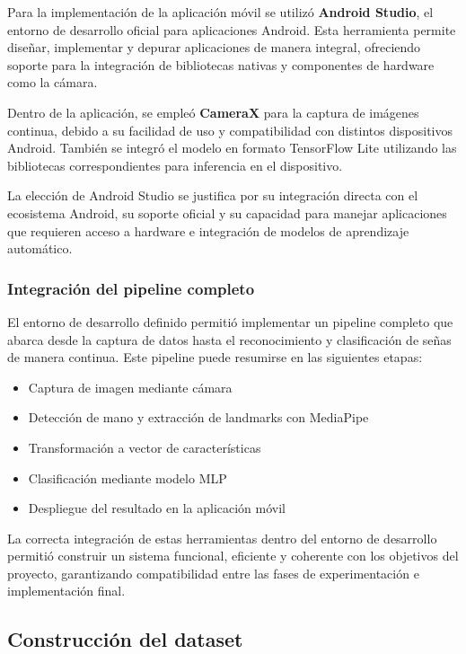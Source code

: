 	Para la implementación de la aplicación móvil se utilizó \textbf{Android Studio}, el entorno de desarrollo oficial para aplicaciones Android. Esta herramienta permite diseñar, implementar y depurar aplicaciones de manera integral, ofreciendo soporte para la integración de bibliotecas nativas y componentes de hardware como la cámara.
	
	Dentro de la aplicación, se empleó \textbf{CameraX} para la captura de imágenes continua, debido a su facilidad de uso y compatibilidad con distintos dispositivos Android. También se integró el modelo en formato TensorFlow Lite utilizando las bibliotecas correspondientes para inferencia en el dispositivo.
	
	La elección de Android Studio se justifica por su integración directa con el ecosistema Android, su soporte oficial y su capacidad para manejar aplicaciones que requieren acceso a hardware e integración de modelos de aprendizaje automático.
	
	\subsubsection{Integración del pipeline completo}
	
	El entorno de desarrollo definido permitió implementar un pipeline completo que abarca desde la captura de datos hasta el reconocimiento y clasificación de señas de manera continua. Este pipeline puede resumirse en las siguientes etapas:
	
	\begin{itemize}
		\item Captura de imagen mediante cámara
		\item Detección de mano y extracción de landmarks con MediaPipe
		\item Transformación a vector de características
		\item Clasificación mediante modelo MLP
		\item Despliegue del resultado en la aplicación móvil
	\end{itemize}
	
	La correcta integración de estas herramientas dentro del entorno de desarrollo permitió construir un sistema funcional, eficiente y coherente con los objetivos del proyecto, garantizando compatibilidad entre las fases de experimentación e implementación final.
	
	\subsection{Construcción del dataset}
	
